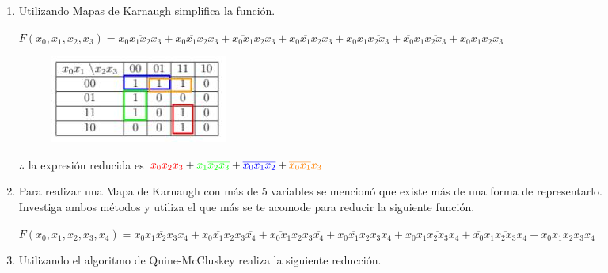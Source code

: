 \documentclass[a4paper,12pt]{article}
\begin{document}
\begin{enumerate}[label=\textcolor{teal}{\textbf{\arabic*.}}]
    \item Utilizando Mapas de Karnaugh simplifica la función.\\
    
        \begin{center}
            $F(x_0,x_1,x_2,x_3) =
            \overline{x_0 x_1 x_2 x_3} 
            +\overline{x_0 x_1 x_2} x_3
            +\overline{x_0 x_1} x_2 x_3
            +x_0 \overline{x_1} x_2 x_3
            + x_0 x_1 \overline{x_2 x_3}
            + \overline{x_0} x_1 \overline{x_2 x_3}
            +x_0 x_1 x_2 x_3
            $
        \end{center}
        
        \begin{figure}[H]
            \centering
            \includegraphics[width=5 cm]{img/mapa9.jpg}
        \end{figure}
        
        $ \therefore$ la expresión reducida es $\textcolor{red}{x_0 x_2 x_3} + \textcolor{green}{x_1 \overline{x_2 x_3}} + \textcolor{blue}{\overline{x_0 x_1 x_2}} + \textcolor{orange}{\overline{x_0 x_1} x_3}$

    \item Para realizar una Mapa de Karnaugh con más de 5 variables se mencionó que existe más de
    una forma de representarlo.\\
    Investiga ambos métodos y utiliza el que más se te acomode para reducir la siguiente función.

    \begin{center}
        $F(x_0,x_1,x_2,x_3,x_4) = 
        \overline{x_0 x_1 x_2 x_3 x_4} 
        + \overline{x_0 x_1 x_2} x_3 \overline{x_4} 
        + \overline{x_0 x_1} x_2 x_3 \overline{x_4} 
        + x_0 \overline{x_1} x_2 x_3 x_4
        + x_0 x_1 \overline{x_2 x_3} x_4
        + \overline{x_0} x_1 \overline{x_2 x_3} x_4
        + x_0 x_1 x_2 x_3 x_4 
        $
    \end{center}
   
    \item Utilizando el algoritmo de Quine-McCluskey realiza la siguiente reducción.\\


\end{enumerate}
\end{document}

